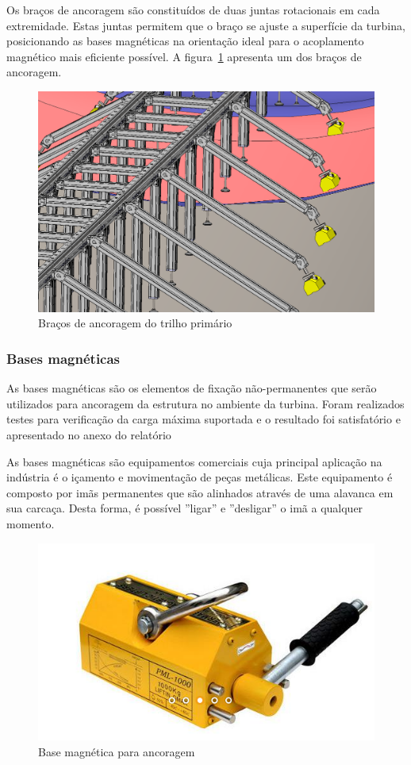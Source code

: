 Os braços de ancoragem são constituídos de duas juntas rotacionais em cada
extremidade. Estas juntas permitem que o braço se ajuste a superfície da
turbina, posicionando as bases magnéticas na orientação ideal para o acoplamento
magnético mais eficiente possível. A figura~\ref{fig::ancoragem} apresenta um
dos braços de ancoragem.

\begin{figure}[H]
	\centering
	\includegraphics[width=0.9\columnwidth]{figs/construcao/ancoragem}
	\caption{Braços de ancoragem do trilho primário}
    \label{fig::ancoragem}
\end{figure}

\subsubsection{Bases magnéticas}

As bases magnéticas são os elementos de fixação não-permanentes que serão
utilizados para ancoragem da estrutura no ambiente da turbina. Foram realizados
testes para verificação da carga máxima suportada e o resultado foi
satisfatório e apresentado no anexo do relatório %

As bases magnéticas são equipamentos comerciais cuja principal aplicação na
indústria é o içamento e movimentação de peças metálicas. Este equipamento é
composto por imãs permanentes que são alinhados através de uma alavanca em sua
carcaça. Desta forma, é possível ''ligar'' e ''desligar'' o imã a qualquer
momento.

\begin{figure}[H]
	\centering
	\includegraphics[width=0.5\columnwidth]{figs/construcao/base_magnetica}
	\caption{Base magnética para ancoragem}
    \label{fig::base_magnetica}
\end{figure}

